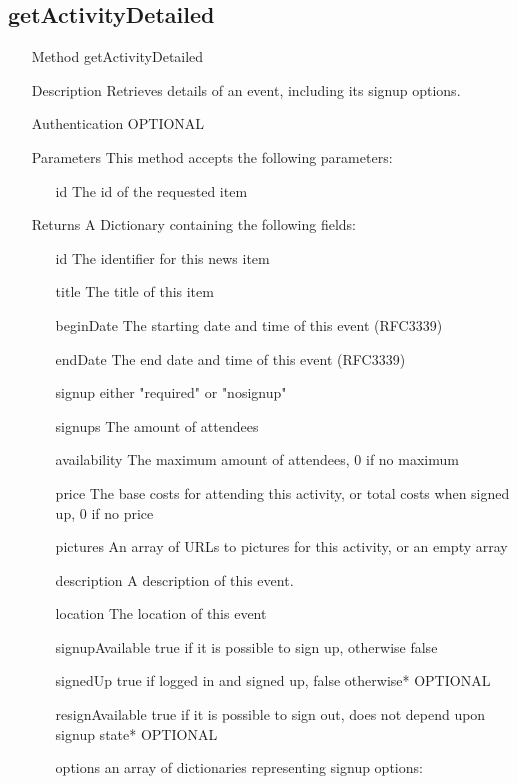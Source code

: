 \documentclass[a4paper]{scrreprt}
\begin{document}
\subsection{getActivityDetailed}
\begin{enumerate}
\item[Method] getActivityDetailed
\item[Description] Retrieves details of an event, including its signup options.
\item[Authentication] OPTIONAL
\item[Parameters] This method accepts the following parameters:
\begin{enumerate}
	\item[id] The id of the requested item
    \end{enumerate}
\item[Returns] A Dictionary containing the following fields:
\begin{enumerate}
    \item[id] The identifier for this news item
    \item[title] The title of this item
    \item[beginDate] The starting date and time of this event (RFC3339)
    \item[endDate] The end date and time of this event (RFC3339)
    \item[signup] either "required" or "nosignup"
    \item[signups] The amount of attendees
    \item[availability] The maximum amount of attendees, 0 if no maximum
    \item[price] The base costs for attending this activity, or total costs when signed up, 0 if no price
    \item[pictures] An array of URLs to pictures for this activity, or an empty array
    \item[description] A description of this event.
    \item[location] The location of this event
    \item[signupAvailable] true if it is possible to sign up, otherwise false
    \item[signedUp] true if logged in and signed up, false otherwise* OPTIONAL
    \item[resignAvailable] true if it is possible to sign out, does not depend upon signup state* OPTIONAL
    \item[options] an array of dictionaries representing signup options:
	\begin{enumerate}

\end{enumerate}
\end{enumerate}
\end{enumerate}
\end{document}
